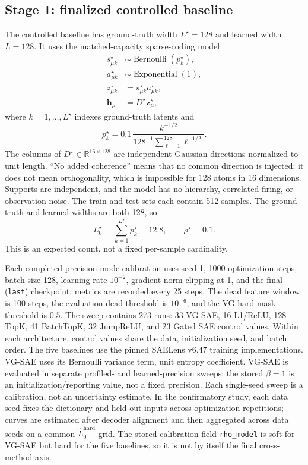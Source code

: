 \documentclass[aps,pre,reprint,superscriptaddress,amsmath,amssymb,nofootinbib]{revtex4-2}
\begin{document}
\subsection{Stage 1: finalized controlled baseline}

The controlled baseline has ground-truth width $L^\star=128$ and learned width
$L=128$.  It uses the matched-capacity sparse-coding model
\begin{align}
 s^\star_{\mu k}&\sim\operatorname{Bernoulli}(p_k^\star),\\
 a^\star_{\mu k}&\sim\operatorname{Exponential}(1),\\
 z^\star_{\mu k}&=s^\star_{\mu k}a^\star_{\mu k},\\
 \bm h_\mu&=D^\star\bm z^\star_\mu,
 \label{eq:stage1-data}
\end{align}
where $k=1,\ldots,L^\star$ indexes ground-truth latents and
\begin{equation}
 p_k^\star=0.1\,
 \frac{k^{-1/2}}{128^{-1}\sum_{\ell=1}^{128}\ell^{-1/2}}.
\end{equation}
The columns of $D^\star\in\mathbb R^{16\times128}$ are independent Gaussian
directions normalized to unit length.  ``No added coherence'' means that no
common direction is injected; it does not mean orthogonality, which is
impossible for 128 atoms in 16 dimensions.  Supports are independent, and the
model has no hierarchy, correlated firing, or observation noise.  The train
and test sets each contain 512 samples.  The ground-truth and learned widths
are both 128, so
\begin{equation}
 L_0^\star=\sum_{k=1}^{L^\star}p_k^\star=12.8,
 \qquad \rho^\star=0.1.
\end{equation}
This is an expected count, not a fixed per-sample cardinality.

Each completed precision-mode calibration uses seed 1, 1000 optimization steps, batch size
128, learning rate $10^{-2}$, gradient-norm clipping at 1, and the final
(\texttt{last}) checkpoint; metrics are recorded every 25 steps.  The dead
feature window is 100 steps, the evaluation dead threshold is $10^{-6}$, and
the VG hard-mask threshold is $0.5$.  The sweep contains 273 runs: 33 VG-SAE, 16
L1/ReLU, 128 TopK, 41 BatchTopK, 32 JumpReLU, and 23 Gated SAE control values.
Within each architecture, control values share the data, initialization seed,
and batch order.  The five baselines use the pinned SAELens v6.47 training
implementations.  VG-SAE uses its Bernoulli variance term, unit entropy
coefficient.  VG-SAE is evaluated in separate profiled- and learned-precision
sweeps; the stored $\beta=1$ is an initialization/reporting value, not a fixed
precision.  Each single-seed sweep is a calibration, not an
uncertainty estimate.  In the confirmatory study, each data seed fixes the
dictionary and held-out inputs across optimization repetitions; curves are
estimated after decoder alignment and then aggregated across data seeds on a
common $\widehat L_0^{\mathrm{hard}}$ grid.  The stored calibration field
\texttt{rho\_model} is soft for VG-SAE but hard for the five baselines, so it is
not by itself the final cross-method axis.
\end{document}
